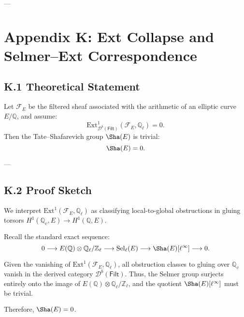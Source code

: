 ---






\section*{Appendix K: Ext Collapse and Selmer--Ext Correspondence}

\subsection*{K.1 Theoretical Statement}

\begin{theorem}
Let \( \mathcal{F}_E \) be the filtered sheaf associated with the arithmetic of an elliptic curve \( E/\mathbb{Q} \), and assume:
\[
\mathrm{Ext}^1_{\mathcal{D}^b(\mathsf{Filt})}(\mathcal{F}_E, \mathbb{Q}_\ell) = 0.
\]
Then the Tate–Shafarevich group \( \Sha(E) \) is trivial:
\[
\Sha(E) = 0.
\]
\end{theorem}

---

\subsection*{K.2 Proof Sketch}

We interpret \( \mathrm{Ext}^1(\mathcal{F}_E, \mathbb{Q}_\ell) \) as classifying local-to-global obstructions in gluing torsors \( H^1(\mathbb{Q}_v, E) \to H^1(\mathbb{Q}, E) \).  

Recall the standard exact sequence:
\[
0 \longrightarrow E(\mathbb{Q}) \otimes \mathbb{Q}_\ell/\mathbb{Z}_\ell \longrightarrow \mathrm{Sel}_\ell(E) \longrightarrow \Sha(E)[\ell^\infty] \longrightarrow 0.
\]

Given the vanishing of \( \mathrm{Ext}^1(\mathcal{F}_E, \mathbb{Q}_\ell) \), all obstruction classes to gluing over \( \mathbb{Q}_v \) vanish in the derived category \( \mathcal{D}^b(\mathsf{Filt}) \). Thus, the Selmer group surjects entirely onto the image of \( E(\mathbb{Q}) \otimes \mathbb{Q}_\ell/\mathbb{Z}_\ell \), and the quotient \( \Sha(E)[\ell^\infty] \) must be trivial.

Therefore, \( \Sha(E) = 0 \).

